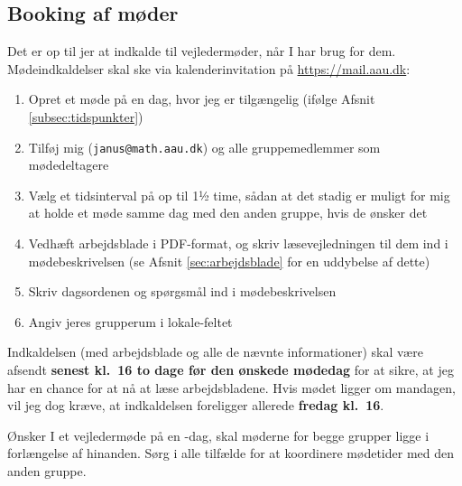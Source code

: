 \documentclass[12pt,a4paper,oneside,final]{article}
\begin{document}
\subsection{Booking af møder}
\label{subsec:booking}
Det er op til jer at indkalde til vejledermøder, når I har brug for dem.
Mødeindkaldelser skal ske via kalenderinvitation på \url{https://mail.aau.dk}:
\begin{enumerate}[itemsep=0pt]
\item Opret et møde på en dag, hvor jeg er tilgængelig (ifølge Afsnit \ref{subsec:tidspunkter})
\item Tilføj mig (\texttt{janus@math.aau.dk}) og alle gruppemedlemmer som mødedeltagere
\item Vælg et tidsinterval på op til 1½ time, sådan at det stadig er muligt for mig at holde et møde samme dag med den anden gruppe, hvis de ønsker det
\item Vedhæft arbejdsblade i PDF-format, og skriv læsevejledningen til dem ind i mødebeskrivelsen (se Afsnit \ref{sec:arbejdsblade} for en uddybelse af dette)
\item Skriv dagsordenen og spørgsmål ind i mødebeskrivelsen
\item Angiv jeres grupperum i lokale-feltet
\end{enumerate}
Indkaldelsen (med arbejdsblade og alle de nævnte informationer) skal være afsendt \textbf{senest kl.\ 16 to dage før den ønskede mødedag} for at sikre, at jeg har en chance for at nå at læse arbejdsbladene.
Hvis mødet ligger om mandagen, vil jeg dog kræve, at indkaldelsen foreligger allerede \textbf{fredag kl.\ 16}.

Ønsker I et vejledermøde på en -dag, skal møderne for begge grupper ligge i forlængelse af hinanden.
Sørg i alle tilfælde for at koordinere mødetider med den anden gruppe.
\end{document}
